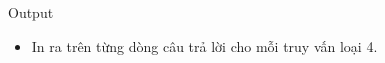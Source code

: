 Output
\begin{itemize}
	\item     In ra trên từng dòng câu trả lời cho mỗi truy vấn loại 4.   
\end{itemize}